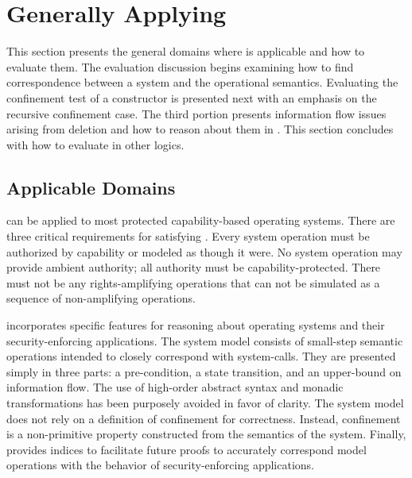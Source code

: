 \section{Generally Applying \TMmodelName{}}

This section presents the general domains where \TMmodelName{} is applicable and how to evaluate them.
The evaluation discussion begins examining how to find correspondence between a system and the \TMmodelName{} operational semantics.
Evaluating the confinement test of a constructor is presented next with an emphasis on the recursive confinement case.
The third portion presents information flow issues arising from deletion and how to reason about them in \TMmodelName{}.
This section concludes with how to evaluate \TMmodelName{} in other logics.

\subsection{Applicable Domains}

\TMmodelName{} can be applied to most protected capability-based operating systems.
There are three critical requirements for satisfying \TMmodelName{}.
Every system operation must be authorized by capability or modeled as though it were.
No system operation may provide ambient authority; all authority must be capability-protected.
There must not be any rights-amplifying operations that can not be simulated as a sequence of non-amplifying operations.

\TMmodelName{} incorporates specific features for reasoning about operating systems and their security-enforcing applications.
The system model consists of small-step semantic operations intended to closely correspond with system-calls.
They are presented simply in three parts: a pre-condition, a state transition, and an upper-bound on information flow.
The use of high-order abstract syntax and monadic transformations has been purposely avoided in favor of clarity.
The system model does not rely on a definition of confinement for correctness.
Instead, confinement is a non-primitive property constructed from the semantics of the system.
Finally, \TMmodelName{} provides indices to facilitate future proofs to accurately correspond model operations with the behavior of security-enforcing applications.

